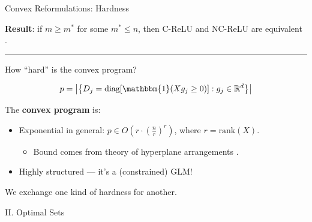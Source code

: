 \documentclass[usenames,dvipsnames,mathserif,notheorems]{beamer}
\newcommand{\horizontalrule}{
	{
			\vspace{-0.5em}
			\center \rule{\textwidth}{0.1em}
			\vspace{-0.2em}
		}
}
\newcommand{\bad}[1]{\textcolor{bad}{#1}}
\newcommand{\good}[1]{\textcolor{good}{#1}}
\begin{document}
\begin{frame}{Convex Reformulations: Hardness}

	\textbf{Result}: if \( m \geq m^* \) for some \( m^* \leq n \),
	then C-ReLU and NC-ReLU are \good{equivalent}
	\citep{pilanci2020convex}.

	\pause
	\horizontalrule

	How ``hard'' is the convex program?
	\pause

	\[
		p = \abs{\cbr{D_j = \text{diag}[\mathbbm{1}(X g_j \geq 0)] : g_j \in \R^d }}
	\]

	\vspace{2em}
	\pause

	The \textbf{convex program} is:
	\vspace{0.5em}
	\begin{itemize}
		\item \bad{Exponential in general}: \( p \in O(r \cdot (\frac{n}{r})^r) \),
		      where \( r = \text{rank}(X) \).
		      \vspace{0.25em}
		      \begin{itemize}
			      \item Bound comes from theory of hyperplane arrangements \citep{winder1966partitions}.
		      \end{itemize}
		      \pause

		      \vspace{0.5em}

		\item Highly \good{structured} --- it's a (constrained) GLM!
	\end{itemize}

	\vspace{1em}
	\pause

	\begin{center}
		\Large
		We exchange one kind of hardness for another.
	\end{center}

\end{frame}

\begin{frame}{}
	\begin{center}
		\huge II. Optimal Sets
	\end{center}
\end{frame}
\end{document}
